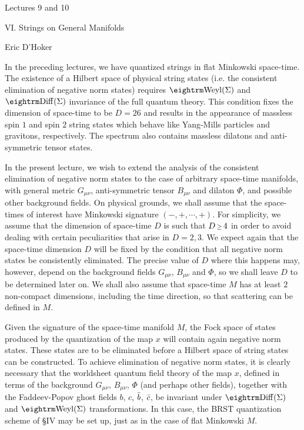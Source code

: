
\parindent=20pt

\bigskip\bigskip
\centerline{\boldtitlefont Lectures 9 and 10}
\medskip
\centerline{\smallboldtitle VI. Strings on General
Manifolds}

\medskip
\centerline{Eric D'Hoker}

\frenchspacing

\dspace
\bigskip
In the preceding lectures, we have quantized strings
in flat Minkowski space-time.
The existence of a Hilbert space of physical string
states (i.e. the consistent elimination
of negative norm states)
requires $\Weyl(\Sigma)$ and $\Diff(\Sigma)$
invariance of the full quantum theory.
This condition fixes the dimension of space-time to be
$D=26$ and results in the appearance of massless spin
$1$ and spin $2$ string states which behave like
Yang-Mills particles and gravitons, respectively.
The spectrum also contains massless dilatons and
anti-symmetric tensor states.

In the present lecture, we wish to extend the analysis
of the consistent elimination of negative norm states
to the case of arbitrary space-time manifolds, with
general metric $G_{\mu\nu}$, anti-symmetric tensor
$B_{\mu\nu}$ and dilaton $\Phi$, and possible other
background fields.
On physical grounds, we shall assume that the
space-times of interest have Minkowski signature
$(-,+,\cdots,+)$.
For simplicity, we assume that the dimension of
space-time $D$ is such that $D\Ge 4$ in order to avoid
dealing with certain peculiarities that arise in
$D=2,3$.
We expect again that the space-time dimension $D$ will
be fixed by the condition that all negative norm states
be consistently eliminated.
The precise value of $D$ where this happens may,
however, depend on the background fields $G_{\mu\nu}$,
$B_{\mu\nu}$ and $\Phi$, so we shall leave $D$ to be
determined later on.
We shall also assume that space-time $M$ has at least
$2$ non-compact dimensions, including the time
direction, so that scattering can be defined in $M$.

Given the signature of the space-time manifold $M$,
the Fock space of states produced by the quantization
of the map $x$ will contain again negative norm
states. 
These states are to be eliminated before a
Hilbert space of string states can be constructed.
To achieve elimination of negative norm states, it
is clearly necessary that the worldsheet 
quantum field theory of
the map $x$, defined in terms of the background
$G_{\mu\nu}$, $B_{\mu\nu}$, $\Phi$ (and perhaps other
fields), together with the Faddeev-Popov ghost fields
$b$, $c$, $\bar{b}$, $\bar{c}$, be invariant under
$\Diff(\Sigma)$ and $\Weyl(\Sigma)$ transformations.
In this case, the BRST quantization scheme of \S{IV} may be
set up, just as in the case of flat Minkowski $M$.

